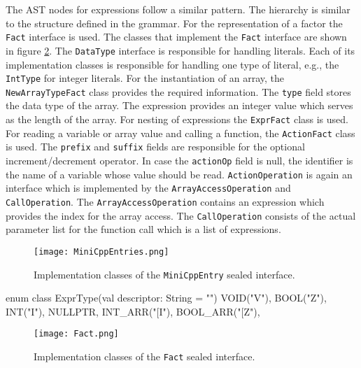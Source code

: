 The AST nodes for expressions follow a similar pattern. The hierarchy is similar to the structure defined in the grammar. For the representation of a factor the \verb|Fact| interface is used. The classes that implement the \verb|Fact| interface are shown in figure \ref{fig:FactDiag}. The \verb|DataType| interface is responsible for handling literals. Each of its implementation classes is responsible for handling one type of literal, e.g., the \verb|IntType| for integer literals. For the instantiation of an array, the \verb|NewArrayTypeFact| class provides the required information. The \verb|type| field stores the data type of the array. The expression provides an integer value which serves as the length of the array. For nesting of expressions the \verb|ExprFact| class is used. For reading a variable or array value and calling a function, the \verb|ActionFact| class is used. The \verb|prefix| and \verb|suffix| fields are responsible for the optional increment/decrement operator. In case the \verb|actionOp| field is null, the identifier is the name of a variable whose value should be read. \verb|ActionOperation| is again an interface which is implemented by the \verb|ArrayAccessOperation| and \verb|CallOperation|. The \verb|ArrayAccessOperation| contains an expression which provides the index for the array access. The \verb|CallOperation| consists of the actual parameter list for the function call which is a list of expressions.

\begin{figure}[]
       \centering
       \texttt{[image: MiniCppEntries.png]}
       \caption{Implementation classes of the \texttt{MiniCppEntry} sealed interface.}
       \label{fig:MiniCppEntriesDiag}
\end{figure}

\begin{KotlinCode}[float,numbers=none,caption=Implementation of the \texttt{ExprType} enum., label=lst:ListExprType]
       enum class ExprType(val descriptor: String = "") {
              VOID("V"),
              BOOL("Z"),
              INT("I"),
              NULLPTR,
              INT_ARR("[I"),
              BOOL_ARR("[Z"),
          }
\end{KotlinCode}

\begin{figure}[]
       \centering
       \texttt{[image: Fact.png]}
       \caption{Implementation classes of the \texttt{Fact} sealed interface.}
       \label{fig:FactDiag}
\end{figure}

